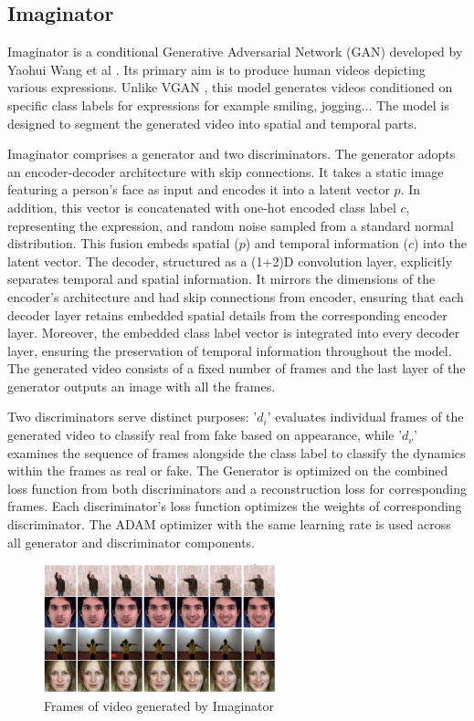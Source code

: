 \documentclass[12pt,twoside,a4paper,parskip]{scrbook} %
\begin{document}
\subsection{Imaginator}
Imaginator is a conditional Generative Adversarial Network (GAN) developed by Yaohui Wang et al \cite{9_imaginator}. Its primary aim is to produce human videos depicting various expressions. Unlike VGAN \cite{8_Vgan}, this model generates videos conditioned on specific class labels for expressions for example smiling, jogging... The model is designed to segment the generated video into spatial and temporal parts.

Imaginator comprises a generator and two discriminators. The generator adopts an encoder-decoder architecture with skip connections. It takes a static image featuring a person's face as input and encodes it into a latent vector $p$.  In addition, this vector is concatenated with one-hot encoded class label $c$, representing the expression, and random noise sampled from a standard normal distribution. This fusion embeds spatial ($p$) and temporal information ($c$) into the latent vector. The decoder, structured as a (1+2)D convolution layer, explicitly separates temporal and spatial information. It mirrors the dimensions of the encoder's architecture and had skip connections from encoder, ensuring that each decoder layer retains embedded spatial details from the corresponding encoder layer. Moreover, the embedded class label vector is integrated into every decoder layer, ensuring the preservation of temporal information throughout the model. The generated video consists of a fixed number of frames and the last layer of the generator outputs an image with all the frames.  

Two discriminators serve distinct purposes: '$d_i$' evaluates individual frames of the generated video to classify real from fake based on appearance, while '$d_v$' examines the sequence of frames alongside the class label to classify the dynamics within the frames as real or fake. The Generator is optimized on the combined loss function from both discriminators and a reconstruction loss for corresponding frames. Each discriminator's loss function optimizes the weights of corresponding discriminator. The ADAM optimizer with the same learning rate is used across all generator and discriminator components.
\begin{figure}[H]
    \centering
    \includegraphics[width=0.6\textwidth]{Images/Imaginator.png}
    \caption{Frames of  video generated by Imaginator}
    \label{fig:Imaginator}
  \end{figure}
  
\end{document}
